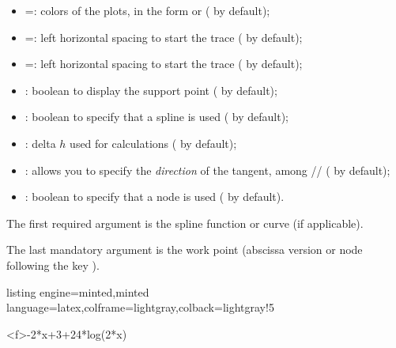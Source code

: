 \documentclass[11pt,a4paper]{ltxdoc}
\begin{document}
\begin{itemize}
	\item {} =: colors of the plots, in the form  or  ( by default);
	\item {} =: left horizontal spacing to start the trace ( by default);
	\item {} =: left horizontal spacing to start the trace ( by default);
	\item {}: boolean to display the support point ( by default);
	\item {}: boolean to specify that a spline is used ( by default);
	\item {}: delta $h$ used for calculations ( by default);
	\item {}: allows you to specify the \textit{direction} of the tangent, among // ( by default);
	\item {}: boolean to specify that a node is used ( by default).
\end{itemize}

\smallskip

The first required argument is the spline function or curve (if applicable).

\smallskip

The last mandatory argument is the work point (abscissa version or node following the key ).

\begin{tcblisting}{listing engine=minted,minted language=latex,colframe=lightgray,colback=lightgray!5}
\begin{GraphTikz}%
	[x=0.9cm,y=0.425cm,Xmin=4,Xmax=20,Origx=4,
	Ymin=40,Ymax=56,Ygrid=2,Ygrids=1,Origy=40]
	{-2*x+3+24*log(2*x)}
\end{GraphTikz}
\end{tcblisting}
\end{document}
